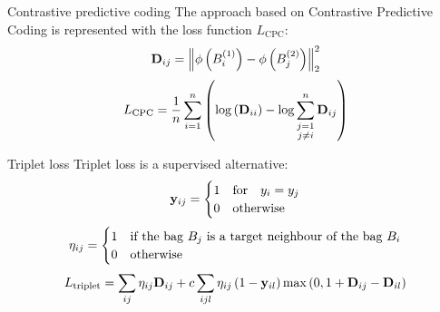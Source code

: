 \documentclass[10pt]{beamer}
\newcommand{\mathmat}{\ensuremath{\mathbf}}
\begin{document}
\begin{frame}{Contrastive predictive coding}
	The approach based on Contrastive Predictive Coding is represented with the loss function \( L_\mathrm{CPC} \):
	\[ \mathmat{D}_{ij} = \left\lVert \phi \left( B_i^{(1)} \right) - \phi \left( B_j^{(2)} \right) \right\rVert_2^2 \]
	\[ L_\mathrm{CPC} = \frac{1}{n} \sum_{i = 1}^n \left( \log \left( \mathmat{D}_{ii} \right) - \log \sum_{\substack{j = 1 \\ j \neq i}}^n \mathmat{D}_{ij} \right) \]
\end{frame}

\begin{frame}{Triplet loss}
	Triplet loss is a supervised alternative:
	\[ \mathmat{y}_{ij} =
		\begin{cases}
			1 &\text{for} \quad y_i = y_j \\
			0 &\text{otherwise}
		\end{cases}
	\]
	\[ \mathmat{\eta}_{ij} = \begin{cases}
		1 &\text{if the bag } B_j \text{ is a target neighbour of the bag } B_i \\
		0 &\text{otherwise}
	\end{cases} \]
	\[ L_\mathrm{triplet} = \sum_{ij} \eta_{ij} \mathmat{D}_{ij} + c \sum_{ijl} \eta_{ij} \left( 1 - \mathmat{y}_{il} \right) \max \left( 0, 1 + \mathmat{D}_{ij} - \mathmat{D}_{il} \right) \]
\end{frame}
\end{document}
